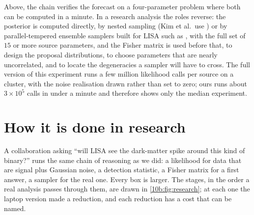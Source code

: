 \begin{inpractice}
Above, the chain verifies the forecast on a four-parameter problem where both can be computed in a minute.
In a research analysis the roles reverse: the posterior is computed directly, by nested sampling (Kim et al.\ use
 \cite{Speagle2020}) or by parallel-tempered ensemble samplers built for LISA such as 
\cite{KarnesisEryn2023}, with the full set of $15$ or more source parameters, and the Fisher matrix is used before
that, to design the proposal distributions, to choose parameters that are nearly uncorrelated, and to locate the
degeneracies a sampler will have to cross. The full version of this experiment runs a few million likelihood calls
per source on a cluster, with the noise realisation drawn rather than set to zero; ours runs about $3\times10^5$ calls in
under a minute and therefore shows only the median experiment.
\end{inpractice}
\section{How it is done in research}
\label{10b:sec:research}

A collaboration asking ``will LISA see the dark-matter spike around this kind of binary?'' runs the same chain of
reasoning as we did: a likelihood for data that are signal plus Gaussian noise, a detection statistic, a Fisher
matrix for a first answer, a sampler for the real one. Every box is larger. The stages, in the order a real analysis
passes through them, are drawn in \cref{10b:fig:research}; at each one the laptop version made a reduction, and each
reduction has a cost that can be named.

